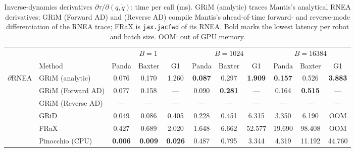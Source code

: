 \begin{table}[t]
  \centering
  \caption{Inverse-dynamics derivatives $\partial\tau/\partial(q,\dot q)$: time per call (ms). GRiM (analytic) traces Mantis's analytical RNEA derivatives; GRiM (Forward AD) and (Reverse AD) compile Mantis's ahead-of-time forward- and reverse-mode differentiation of the RNEA trace; FRaX is \texttt{jax.jacfwd} of its RNEA. Bold marks the lowest latency per robot and batch size. OOM: out of GPU memory.}
  \label{tab:did}
  \footnotesize
  \setlength{\tabcolsep}{4pt}
  \begin{tabular}{llccccccccc}
    \toprule
    & & \multicolumn{3}{c}{$B = 1$} & \multicolumn{3}{c}{$B = 1024$} & \multicolumn{3}{c}{$B = 16384$} \\
    \cmidrule(lr){3-5}\cmidrule(lr){6-8}\cmidrule(lr){9-11}
    & Method & Panda & Baxter & G1 & Panda & Baxter & G1 & Panda & Baxter & G1 \\
    \midrule
    \multirow{6}{*}{$\partial$RNEA}
      & GRiM (analytic) & 0.076 & 0.170 & 1.260 & \textbf{0.087} & 0.297 & \textbf{1.909} & \textbf{0.157} & 0.526 & \textbf{3.883} \\
      & GRiM (Forward AD) & 0.077 & 0.158 & --- & 0.090 & \textbf{0.281} & --- & 0.164 & \textbf{0.515} & --- \\
      & GRiM (Reverse AD) & --- & --- & --- & --- & --- & --- & --- & --- & --- \\
      & GRiD & 0.049 & 0.086 & 0.405 & 0.228 & 0.451 & 6.315 & 3.350 & 6.190 & OOM \\
      & FRaX & 0.427 & 0.689 & 2.020 & 1.648 & 6.662 & 52.577 & 19.690 & 98.408 & OOM \\
      & Pinocchio (CPU) & \textbf{0.006} & \textbf{0.009} & \textbf{0.026} & 0.487 & 0.795 & 3.344 & 4.319 & 11.192 & 44.760 \\
    \bottomrule
  \end{tabular}
\end{table}
